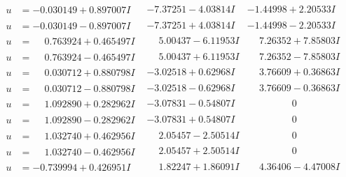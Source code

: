 \documentclass[1p]{elsarticle_modified}
\theoremstyle{definition}
\begin{document}
$$\begin{array}{c|c|c}
\begin{aligned}
u &= -0.030149 + 0.897007 I\end{aligned}
 & -7.37251 - 4.03814 I & -1.44998 + 2.20533 I \\ \hline\begin{aligned}
u &= -0.030149 - 0.897007 I\end{aligned}
 & -7.37251 + 4.03814 I & -1.44998 - 2.20533 I \\ \hline\begin{aligned}
u &= \phantom{-}0.763924 + 0.465497 I\end{aligned}
 & \phantom{-}5.00437 - 6.11953 I & \phantom{-}7.26352 + 7.85803 I \\ \hline\begin{aligned}
u &= \phantom{-}0.763924 - 0.465497 I\end{aligned}
 & \phantom{-}5.00437 + 6.11953 I & \phantom{-}7.26352 - 7.85803 I \\ \hline\begin{aligned}
u &= \phantom{-}0.030712 + 0.880798 I\end{aligned}
 & -3.02518 + 0.62968 I & \phantom{-}3.76609 + 0.36863 I \\ \hline\begin{aligned}
u &= \phantom{-}0.030712 - 0.880798 I\end{aligned}
 & -3.02518 - 0.62968 I & \phantom{-}3.76609 - 0.36863 I \\ \hline\begin{aligned}
u &= \phantom{-}1.092890 + 0.282962 I\end{aligned}
 & -3.07831 - 0.54807 I & \phantom{-0.000000 } 0 \\ \hline\begin{aligned}
u &= \phantom{-}1.092890 - 0.282962 I\end{aligned}
 & -3.07831 + 0.54807 I & \phantom{-0.000000 } 0 \\ \hline\begin{aligned}
u &= \phantom{-}1.032740 + 0.462956 I\end{aligned}
 & \phantom{-}2.05457 - 2.50514 I & \phantom{-0.000000 } 0 \\ \hline\begin{aligned}
u &= \phantom{-}1.032740 - 0.462956 I\end{aligned}
 & \phantom{-}2.05457 + 2.50514 I & \phantom{-0.000000 } 0 \\ \hline\begin{aligned}
u &= -0.739994 + 0.426951 I\end{aligned}
 & \phantom{-}1.82247 + 1.86091 I & \phantom{-}4.36406 - 4.47008 I \\ \hline\begin{aligned}

\end{aligned}
\end{array}$$
\end{document}
